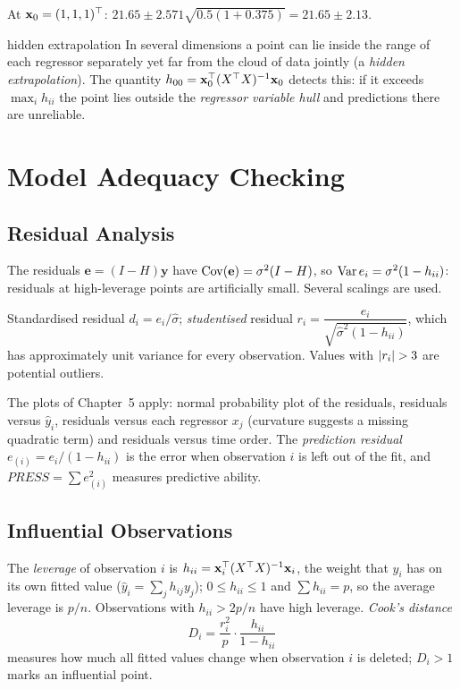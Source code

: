 \begin{example}
At $\mathbf{x}_0=(1,1,1)^{\top}$: $21.65\pm2.571\sqrt{0.5(1+0.375)}=21.65\pm2.13$.
\end{example}

\begin{pitfall}{hidden extrapolation}
In several dimensions a point can lie inside the range of each regressor separately yet far from the cloud of data jointly (a \emph{hidden extrapolation}). The quantity $h_{00}=\mathbf{x}_0^{\top}(X^{\top} X)^{-1}\mathbf{x}_0$ detects this: if it exceeds $\max_ih_{ii}$ the point lies outside the \emph{regressor variable hull} and predictions there are unreliable.
\end{pitfall}

\section{Model Adequacy Checking}

\subsection{Residual Analysis}

The residuals $\mathbf{e}=(I-H)\mathbf{y}$ have $\operatorname{Cov}(\mathbf{e})=\sigma^2(I-H)$, so $\operatorname{Var} e_i=\sigma^2(1-h_{ii})$: residuals at high-leverage points are artificially small. Several scalings are used.

\begin{definition}
Standardised residual $d_i=e_i/\hat\sigma$; \emph{studentised} residual $r_i=\dfrac{e_i}{\sqrt{\hat\sigma^2(1-h_{ii})}}$, which has approximately unit variance for every observation. Values with $\lvert r_i\rvert>3$ are potential outliers.
\end{definition}

The plots of Chapter~5 apply: normal probability plot of the residuals, residuals versus $\hat{y}_i$, residuals versus each regressor $x_j$ (curvature suggests a missing quadratic term) and residuals versus time order. The \emph{prediction residual} $e_{(i)}=e_i/(1-h_{ii})$ is the error when observation $i$ is left out of the fit, and $PRESS=\sum e_{(i)}^2$ measures predictive ability.

\subsection{Influential Observations}

\begin{definition}
The \emph{leverage} of observation $i$ is $h_{ii}=\mathbf{x}_i^{\top}(X^{\top} X)^{-1}\mathbf{x}_i$, the weight that $y_i$ has on its own fitted value ($\hat{y}_i=\sum_jh_{ij}y_j$); $0\le h_{ii}\le1$ and $\sum h_{ii}=p$, so the average leverage is $p/n$. Observations with $h_{ii}>2p/n$ have high leverage. \emph{Cook's distance}
\[ D_i=\frac{r_i^2}p\cdot\frac{h_{ii}}{1-h_{ii}} \]
measures how much all fitted values change when observation $i$ is deleted; $D_i>1$ marks an influential point.
\end{definition}

